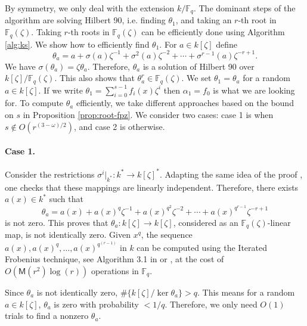 \documentclass[12pt]{article}
\theoremstyle{plain}
\theoremstyle{definition}
\def\F{\ensuremath{\mathbb{F}}}
\def\MM{\ensuremath{\mathsf{M}}}
\newcounter{algorithm}
\begin{document}
By symmetry, we only deal with the extension $k / \F_q$. The dominant steps of the algorithm are 
solving Hilbert 90, i.e. finding $\theta_1$, and taking an $r$-th root in $\F_q(\zeta)$. Taking $r$-th roots in $\F_q(\zeta)$ can be efficiently done using 
Algorithm \ref{alg:ks}. We show how to efficiently find $\theta_1$. For $a \in k[\zeta]$ define
\[ \theta_a = a + \sigma(a)\zeta^{-1} + \sigma^2(a)\zeta^{-2} + \cdots + \sigma^{r - 1}(a)\zeta^{-r 
	+ 1}. \]
We have $\sigma(\theta_a) = \zeta\theta_a$. Therefore, $\theta_a$ is a solution of Hilbert 90 over 
$k[\zeta]/\F_q(\zeta)$. This also shows that $\theta_a^r \in \F_q(\zeta)$. We set $\theta_1 = 
\theta_a$ for a random $a \in k[\zeta]$. If we write $\theta_1 = \sum_{i = 0}^{s - 1}f_i(x)\zeta^i$ 
then $\alpha_1 = f_0$ is what we are looking for. To compute $\theta_a$ efficiently, we take 
different approaches based on the bound on $s$ in Proposition \ref{prop:root-fpz}. We consider two 
cases: case 1 is when $s \notin O(r^{(3 - \omega) / 2})$, and case 2 is otherwise. 

\paragraph{Case 1.}
Consider the restrictions $\sigma^i \vert_{k^*}: k^* \rightarrow k[\zeta]^*$. Adapting the same 
idea of the proof \cite[Ch VI, Theorem 4.1]{lang}, one checks that these mappings are linearly 
independent. Therefore, there exists $a(x) \in k^*$ such that 
\[ \theta_a = a(x) + a(x)^q\zeta^{-1} + a(x)^{q^2}\zeta^{-2} + \cdots + a(x)^{q^{r - 1}}\zeta^{-r 
	+ 1}\]
is not zero. This proves that $\theta_a: k[\zeta] \rightarrow k[\zeta]$, considered as an 
$\F_q(\zeta)$-linear map, is not identically zero. Given $x^q$, the sequence $a(x), a(x)^q, \dots, 
a(x)^{q^{(r - 1)}}$ in $k$ can be computed using the Iterated Frobenius technique, see Algorithm 
3.1 in \cite{von1992computing} or \cite[Ch.~14.7]{vzGG}, at the cost of $O(\MM(r^2)\log(r))$ 
operations in $\F_q$.

Since $\theta_a$ is not identically zero, $\#\{k[\zeta] / \ker \theta_a \} > q$. This means for a 
random $a \in k[\zeta]$, $\theta_a$ is zero with probability $< 1 / q$. Therefore, we only 
need $O(1)$ trials to find a nonzero $\theta_a$.
\end{document}
